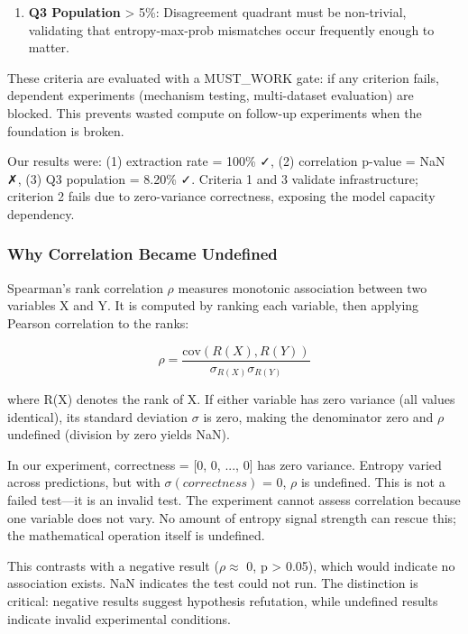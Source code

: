 \begin{enumerate}
\item \textbf{Q3 Population} > 5\%: Disagreement quadrant must be non-trivial, validating that entropy-max-prob mismatches occur frequently enough to matter.
\end{enumerate}

These criteria are evaluated with a MUST\_WORK gate: if any criterion fails, dependent experiments (mechanism testing, multi-dataset evaluation) are blocked. This prevents wasted compute on follow-up experiments when the foundation is broken.

Our results were: (1) extraction rate = 100\% ✓, (2) correlation p-value = NaN ✗, (3) Q3 population = 8.20\% ✓. Criteria 1 and 3 validate infrastructure; criterion 2 fails due to zero-variance correctness, exposing the model capacity dependency.

\subsubsection{Why Correlation Became Undefined}

Spearman's rank correlation $\rho$ measures monotonic association between two variables X and Y. It is computed by ranking each variable, then applying Pearson correlation to the ranks:

$$\rho = \frac{\text{cov}(R(X), R(Y))}{\sigma_{R(X)} \sigma_{R(Y)}}$$

where R(X) denotes the rank of X. If either variable has zero variance (all values identical), its standard deviation $\sigma$ is zero, making the denominator zero and $\rho$ undefined (division by zero yields NaN).

In our experiment, correctness = [0, 0, ..., 0] has zero variance. Entropy varied across predictions, but with $\sigma (correctness)$ = 0, $\rho$ is undefined. This is not a failed test---it is an invalid test. The experiment cannot assess correlation because one variable does not vary. No amount of entropy signal strength can rescue this; the mathematical operation itself is undefined.

This contrasts with a negative result ($\rho \approx$ 0, p > 0.05), which would indicate no association exists. NaN indicates the test could not run. The distinction is critical: negative results suggest hypothesis refutation, while undefined results indicate invalid experimental conditions.

